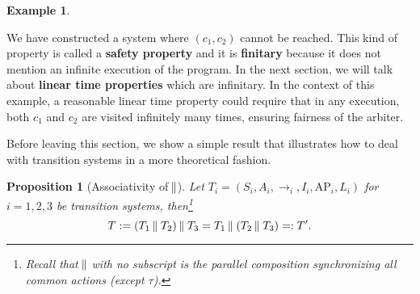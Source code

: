 \documentclass{tufte-handout} %
\newtheorem{prop}[thm]{Proposition}
\theoremstyle{definition}
\newtheorem{exmp}[thm]{Example}
\theoremstyle{remark}
\newcommand{\0}{\textsf{0}}
\newcommand{\1}{\textsf{1}}
\newcommand{\AP}{\text{AP}}
\newcommand{\dmid}{\kern-0.20ex\mid\kern-0.20ex\mid}
\begin{document}
\begin{exmp}
\begin{center}
	\end{center}

	We have constructed a system where $(c_1, c_2)$ cannot be reached. This kind of property is called a \textbf{safety property} and it is \textbf{finitary} because it does not mention an infinite execution of the program. In the next section, we will talk about \textbf{linear time properties} which are infinitary. In the context of this example, a reasonable linear time property could require that in any execution, both $c_1$ and $c_2$ are visited infinitely many times, ensuring fairness of the arbiter.
\end{exmp}
Before leaving this section, we show a simple result that illustrates how to deal with transition systems in a more theoretical fashion.
\begin{prop}[Associativity of $\dmid$]
	Let $T_i = (S_i, A_i, \rightarrow_i, I_i, \AP_i, L_i)$ for $i=1,2,3$ be transition systems, then\footnote{Recall that $\dmid$ with no subscript is the parallel composition synchronizing all common actions (except $\tau$).}
	\[T := (T_1 \dmid T_2) \dmid T_3 = T_1 \dmid (T_2 \dmid T_3) =: T'.\]
\end{prop}
\end{document}
